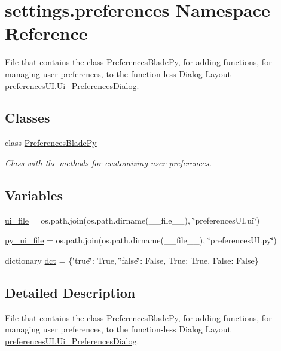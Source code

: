 \hypertarget{a00059}{}\section{settings.\+preferences Namespace Reference}
\label{a00059}


File that contains the class \hyperlink{a00102}{Preferences\+Blade\+Py}, for adding functions, for managing user preferences, to the function-\/less Dialog Layout \hyperlink{a00106}{preferences\+U\+I.\+Ui\+\_\+\+Preferences\+Dialog}.  


\subsection*{Classes}
\begin{DoxyCompactItemize}
\item 
class \hyperlink{a00102}{Preferences\+Blade\+Py}
\begin{DoxyCompactList}\small\item\em Class with the methods for customizing user preferences. \end{DoxyCompactList}\end{DoxyCompactItemize}
\subsection*{Variables}
\begin{DoxyCompactItemize}
\item 
\hyperlink{a00059_a033eb50e8b7b2de7816c6e423cf89fa2}{ui\+\_\+file} = os.\+path.\+join(os.\+path.\+dirname(\+\_\+\+\_\+file\+\_\+\+\_\+), \char`\"{}preferences\+U\+I.\+ui\char`\"{})
\item 
\hyperlink{a00059_ae7e022019493035187806fac02749517}{py\+\_\+ui\+\_\+file} = os.\+path.\+join(os.\+path.\+dirname(\+\_\+\+\_\+file\+\_\+\+\_\+), \char`\"{}preferences\+U\+I.\+py\char`\"{})
\item 
dictionary \hyperlink{a00059_a733f21e501f603b086934c865c62d41d}{dct} = \{\char`\"{}true\char`\"{}\+: True, \char`\"{}false\char`\"{}\+: False, True\+: True, False\+: False\}
\end{DoxyCompactItemize}


\subsection{Detailed Description}
File that contains the class \hyperlink{a00102}{Preferences\+Blade\+Py}, for adding functions, for managing user preferences, to the function-\/less Dialog Layout \hyperlink{a00106}{preferences\+U\+I.\+Ui\+\_\+\+Preferences\+Dialog}. 



